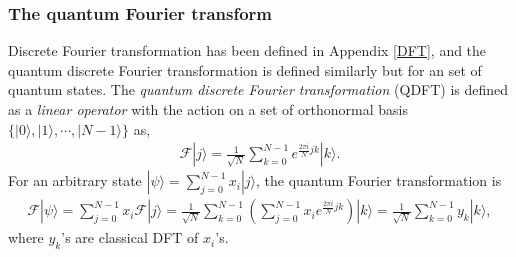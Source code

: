 \documentclass{article}
\newcommand{\ket}[1]{| #1 \rangle}  %
\begin{document}
\subsubsection{The quantum Fourier transform}
Discrete Fourier transformation has been defined in Appendix \ref{DFT}, and the quantum discrete Fourier transformation is defined similarly but for an set of quantum states. The \textit{quantum discrete Fourier transformation} (QDFT) is defined as a \textit{linear operator} with the action on a set of orthonormal basis $\{\ket{0}, \ket{1}, \cdots, \ket{N-1}\}$ as,
\begin{align}
	\mathcal{F}\ket{j} = \frac{1}{\sqrt{N}} \sum_{k=0}^{N-1} e^{\frac{2\pi i}{N} jk} \ket{k}. \label{QDFT_def}
\end{align}
For an arbitrary state $\ket{\psi}=\sum_{j=0}^{N-1} x_i \ket{j}$, the quantum Fourier transformation is 
\begin{align}
	\mathcal{F} \ket{\psi} = \sum_{j=0}^{N-1} x_i \mathcal{F}\ket{j} =\frac{1}{\sqrt{N}} \sum_{k=0}^{N-1} \left( \sum_{j=0}^{N-1} x_i e^{\frac{2\pi i}{N} jk} \right) \ket{k} = \frac{1}{\sqrt{N}} \sum_{k=0}^{N-1} y_k \ket{k},
\end{align}
where $y_k$'s are classical DFT of $x_i$'s.
\end{document}
